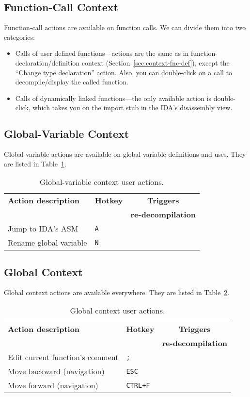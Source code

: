 \documentclass[pdftex, a4paper,12pt, oneside, svgnames]{article}
\newcommand{\xmark}{\ding{55}}%
\begin{document}
\subsection{Function-Call Context}
Function-call actions are available on function calls. We can divide them into two categories:
\begin{itemize}
	\item Calls of user defined functions---actions are the same as in function-declaration/definition context (Section~\ref{sec:context-fnc-def}), except the ``Change type declaration'' action. Also, you can double-click on a call to decompile/display the called function.
	\item Calls of dynamically linked functions---the only available action is double-click, which takes you on the import stub in the IDA's disassembly view.
\end{itemize}

\subsection{Global-Variable Context}
Global-variable actions are available on global-variable definitions and uses. They are listed in Table~\ref{table:global-var-context}.

\begin{table}[!ht]
\centering
\caption{Global-variable context user actions.}
\label{table:global-var-context}
\begin{tabular}{llc}
\textbf{Action description} & \textbf{Hotkey} & \textbf{Triggers}\\
& & \textbf{re-decompilation}\\
\hline
Jump to IDA's ASM & \texttt{A} & \xmark \\
Rename global variable & \texttt{N} & \xmark
\end{tabular}
\end{table}

\subsection{Global Context}
Global context actions are available everywhere. They are listed in Table~\ref{table:global-context}.

\begin{table}[!ht]
\centering
\caption{Global context user actions.}
\label{table:global-context}
\begin{tabular}{llc}
\textbf{Action description} & \textbf{Hotkey} & \textbf{Triggers}\\
& & \textbf{re-decompilation}\\
\hline
Edit current function's comment & \texttt{;} & \xmark \\
Move backward (navigation) & \texttt{ESC} & \xmark \\
Move forward (navigation) & \texttt{CTRL+F} & \xmark
\end{tabular}
\end{table}
\end{document}
